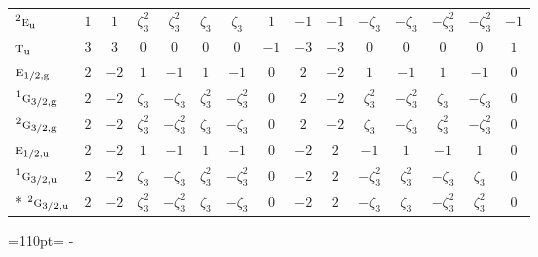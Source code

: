 \documentclass[10pt,a4paper]{article}
\makeatletter
\def\grouprule#1#2{\noalign{\marks\LTgroupmarks{\the\belowrulesep}\nobreak\vskip#1%
  \vskip\aboverulesep}\multispan\LT@cols\unskip{\leaders\hrule\@height#2\hfill\kern\z@}\cr
  \noalign{\penalty\LTrulebreak\vskip\belowrulesep\global\@lastruleclass\z@}}
\newcommand{\needspace}[1]{\par\penalty-100\begingroup\dimen0=#1\relax\dimen2=\pagegoal
  \advance\dimen2-\pagetotal\ifdim\dimen0>\dimen2\relax\ifdim\dimen2>0pt\vfil\break\fi\fi
  \endgroup}
\numberwithin{equation}{section}
\newcommand{\irr}[1]{\text{\normalfont\scshape #1}}
\newcommand{\conjpair}[1]{{}^{#1}}
\newcommand{\ptag}[1]{\mathrm{#1}}
\newcommand{\rootunity}[1]{\zeta_{#1}}
\makeatother
\begin{document}
{\begin{longtable}{@{}lcccccccccccccc@{}}
$\conjpair{2}\irr{e}_{\ptag{u}}$ & $1$ & $1$ & $\rootunity{3}^{2}$ & $\rootunity{3}^{2}$ & $\rootunity{3}$ & $\rootunity{3}$ & $1$ & $-1$ & $-1$ & $-\rootunity{3}$ & $-\rootunity{3}$ & $-\rootunity{3}^{2}$ & $-\rootunity{3}^{2}$ & $-1$\\
$\irr{t}_{\ptag{u}}$ & $3$ & $3$ & $0$ & $0$ & $0$ & $0$ & $-1$ & $-3$ & $-3$ & $0$ & $0$ & $0$ & $0$ & $1$\\
\grouprule{0pt}{\lightrulewidth}
$\irr{e}_{1/2,\ptag{g}}$ & $2$ & $-2$ & $1$ & $-1$ & $1$ & $-1$ & $0$ & $2$ & $-2$ & $1$ & $-1$ & $1$ & $-1$ & $0$\\
$\conjpair{1}\irr{g}_{3/2,\ptag{g}}$ & $2$ & $-2$ & $\rootunity{3}$ & $-\rootunity{3}$ & $\rootunity{3}^{2}$ & $-\rootunity{3}^{2}$ & $0$ & $2$ & $-2$ & $\rootunity{3}^{2}$ & $-\rootunity{3}^{2}$ & $\rootunity{3}$ & $-\rootunity{3}$ & $0$\\
$\conjpair{2}\irr{g}_{3/2,\ptag{g}}$ & $2$ & $-2$ & $\rootunity{3}^{2}$ & $-\rootunity{3}^{2}$ & $\rootunity{3}$ & $-\rootunity{3}$ & $0$ & $2$ & $-2$ & $\rootunity{3}$ & $-\rootunity{3}$ & $\rootunity{3}^{2}$ & $-\rootunity{3}^{2}$ & $0$\\
$\irr{e}_{1/2,\ptag{u}}$ & $2$ & $-2$ & $1$ & $-1$ & $1$ & $-1$ & $0$ & $-2$ & $2$ & $-1$ & $1$ & $-1$ & $1$ & $0$\\
$\conjpair{1}\irr{g}_{3/2,\ptag{u}}$ & $2$ & $-2$ & $\rootunity{3}$ & $-\rootunity{3}$ & $\rootunity{3}^{2}$ & $-\rootunity{3}^{2}$ & $0$ & $-2$ & $2$ & $-\rootunity{3}^{2}$ & $\rootunity{3}^{2}$ & $-\rootunity{3}$ & $\rootunity{3}$ & $0$\\*
$\conjpair{2}\irr{g}_{3/2,\ptag{u}}$ & $2$ & $-2$ & $\rootunity{3}^{2}$ & $-\rootunity{3}^{2}$ & $\rootunity{3}$ & $-\rootunity{3}$ & $0$ & $-2$ & $2$ & $-\rootunity{3}$ & $\rootunity{3}$ & $-\rootunity{3}^{2}$ & $\rootunity{3}^{2}$ & $0$\\
\bottomrule\end{longtable}}
\needspace{110pt}
\end{document}
